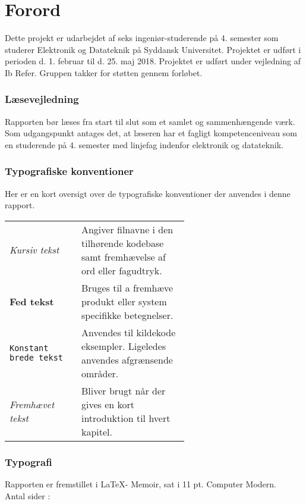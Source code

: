 \chapter*{Forord}\label{chap:forord}
Dette projekt er udarbejdet af seks ingeniør-studerende på 4. semester som studerer Elektronik og Datateknik på Syddansk Universitet. 
Projektet er udført i perioden d. 1. februar til d. 25. maj 2018. 
Projektet er udført under vejledning af Ib Refer. Gruppen takker for støtten gennem forløbet. 


\subsection{Læsevejledning}
Rapporten bør læses fra start til slut som et samlet og sammenhængende værk. 
Som udgangspunkt antages det, at læseren har et fagligt kompetenceniveau som en studerende på 4. semester med linjefag indenfor elektronik og datateknik.

\subsection{Typografiske konventioner}
Her er en kort oversigt over de typografiske konventioner der anvendes i denne rapport.

\bigskip

\begin{tabular}{l p{0.6\linewidth}}
	\textit{Kursiv tekst}			& Angiver filnavne i den tilhørende kodebase samt fremhævelse af ord eller fagudtryk. \\
	\textbf{Fed tekst}				& Bruges til a fremhæve produkt eller system specifikke betegnelser.\\
	\texttt{Konstant brede tekst}	& Anvendes til kildekode eksempler. Ligeledes anvendes afgrænsende områder.\\
	\emph{Fremhævet tekst}		    & Bliver brugt når der gives en kort introduktion til hvert kapitel.\\
\end{tabular}

\subsection{Typografi}
Rapporten er fremstillet i \LaTeX - Memoir, sat i 11 pt. Computer Modern.\\
Antal sider : \pageref{LastPage}